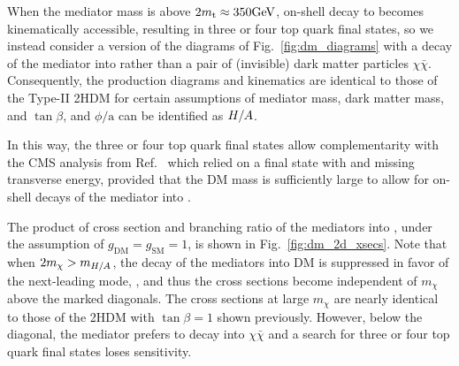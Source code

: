 When the mediator mass is above $2 m_\mathrm{t} \approx 350\text{GeV}$, on-shell
decay to \ttbar becomes kinematically accessible, resulting in three or four top
quark final states, so we instead consider a version of the diagrams of
Fig.~\ref{fig:dm_diagrams} with a decay of the mediator into \ttbar rather
than a pair of (invisible) dark matter particles $\chi\bar{\chi}$.
Consequently, the production diagrams and kinematics are identical to those
of the Type-II 2HDM for certain assumptions of mediator mass, dark matter mass,
and $\tan\beta$, and $\phi/\mathrm{a}$ can be identified as $H/A$.

In this way, the three or four top quark final states
allow complementarity with the CMS analysis from Ref.~\cite{CMS:DMsingletop} which relied on
a final state with \ttbar and missing transverse energy, provided that
the DM mass is sufficiently large to allow for on-shell decays of the mediator into \ttbar.

The product of cross section and branching ratio of the mediators into \ttbar,
under the assumption of $g_\mathrm{DM}=g_\mathrm{SM}=1$, is shown in 
Fig.~\ref{fig:dm_2d_xsecs}. Note that when $2 m_{\chi}>m_{H/A}$,
the decay of the mediators into DM is suppressed in favor of the next-leading mode,
\ttbar, and thus the cross sections become independent of $m_\chi$ above the
marked diagonals. The cross sections at large $m_\chi$ are nearly
identical to those of the 2HDM with $\tan\beta = 1$ shown previously.
However, below the diagonal, the mediator prefers to decay into $\chi\bar{\chi}$
and a search for three or four top quark final states loses sensitivity.

